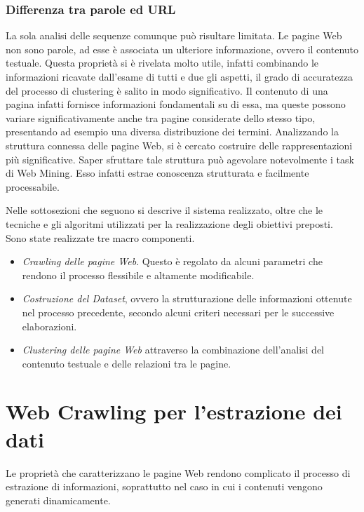 \subsubsection{Differenza tra parole ed URL}
La sola analisi delle sequenze comunque può risultare limitata. Le pagine Web non sono parole, ad esse è associata un ulteriore informazione, ovvero il contenuto testuale. Questa proprietà si è rivelata molto utile, infatti combinando le informazioni ricavate dall'esame di tutti e due gli aspetti, il grado di accuratezza del processo di clustering è salito in modo significativo. Il contenuto di una pagina infatti fornisce informazioni fondamentali su di essa, ma queste possono variare significativamente anche tra pagine considerate dello stesso tipo, presentando ad esempio una diversa distribuzione dei termini. Analizzando la struttura connessa delle pagine Web, si è cercato costruire delle rappresentazioni più significative.
Saper sfruttare tale struttura può agevolare notevolmente i task di Web Mining. Esso infatti estrae conoscenza strutturata e facilmente processabile.

Nelle sottosezioni che seguono si descrive il sistema realizzato, oltre che le tecniche e gli algoritmi utilizzati per la realizzazione degli obiettivi preposti.\\
Sono state realizzate tre macro componenti.
\begin{itemize}
\item \textit{Crawling delle pagine Web}. Questo è regolato da alcuni parametri che rendono il processo flessibile e altamente modificabile.
\item \textit{Costruzione del Dataset}, ovvero la strutturazione delle informazioni ottenute nel processo precedente, secondo alcuni criteri necessari per le successive elaborazioni.
\item \textit{Clustering delle pagine Web} attraverso la combinazione dell'analisi del contenuto testuale e delle relazioni tra le pagine.
\end{itemize}

\section{Web Crawling per l'estrazione dei dati}
\label{crawling}
Le proprietà che caratterizzano le pagine Web rendono complicato il processo di estrazione di informazioni, soprattutto nel caso in cui i contenuti vengono generati dinamicamente.

